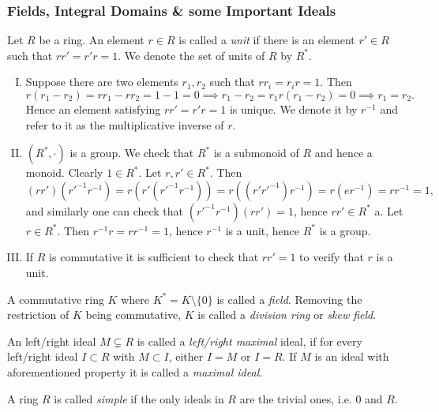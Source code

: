 \subsubsection{Fields, Integral Domains \& some Important Ideals}
\begin{definition}
    Let $R$ be a ring. An element $r\in R$ is called a \textit{unit} if there is an element $r'\in R$ such that $rr'=r'r = 1$. We denote the set of units of $R$ by $R^\ast$.
\end{definition}
\begin{remark}
    \begin{enumerate}[I.]
        \item Suppose there are two elements $r_1,r_2$ such that $rr_i = r_ir = 1$. Then 
        $$r(r_1-r_2) = rr_1-rr_2=1-1=0 \implies r_1-r_2=r_1r(r_1-r_2)=0 \implies r_1 =r_2.$$
        Hence an element satisfying $rr'=r'r=1$ is unique. We denote it by $r^{-1}$ and refer to it as the multiplicative inverse of $r$. 
        \item $(R^\ast, \cdot)$ is a group. We check that $R^\ast$ is a submonoid of $R$ and hence a monoid. Clearly $1 \in R^\ast$. Let $r,r' \in R^\ast$. Then $$\left(rr'\right)\left(r'^{-1}r^{-1}\right)=r\left(r'\left(r'^{-1}r^{-1}\right)\right)=r\left(\left(r'r'^{-1}\right)r^{-1}\right)=r\left(er^{-1}\right) = rr^{-1} = 1,$$
        and similarly one can check that $\left(r'^{-1}r^{-1}\right)(rr') = 1$, hence $rr'\in R^\ast$ a. Let $r\in R^\ast$. Then $r^{-1}r=rr^{-1}=1$, hence $r^{-1}$ is a unit, hence $R^\ast$ is a group.
        \item If $R$ is commutative it is sufficient to check that $rr'=1$ to verify that $r$ is a unit.
    \end{enumerate}   
\end{remark}
\begin{definition}
    A commutative ring $K$ where $K^\ast = K\setminus \{0\}$ is called a \textit{field}. Removing the restriction of $K$ being commutative, $K$ is called a \textit{division ring} or \textit{skew field}.
\end{definition}
\begin{definition}
    An left/right ideal $M\subsetneq R$ is called a \textit{left/right maximal} ideal, if for every left/right ideal $I\subset R$ with $M\subset I$, either $I=M$ or $I=R$. If $M$ is an ideal with aforementioned property it is called a \textit{maximal ideal}.  
\end{definition}
\begin{definition}
    A ring $R$ is called \textit{simple} if the only ideals in $R$ are the trivial ones, i.e. $0$ and $R$.
\end{definition}
